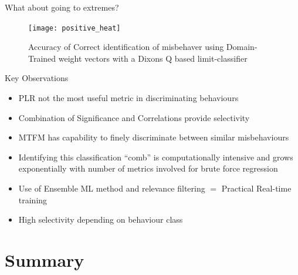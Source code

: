 \documentclass[aspectratio=169]{beamer}
\begin{document}
\begin{frame}{What about going to extremes?}

  \begin{figure}
    \centering
    \texttt{[image: positive\_heat]}
    \caption{Accuracy of Correct identification of misbehaver using Domain-Trained weight vectors with a Dixons Q based limit-classifier}
    \label{fig:positive_heat}
  \end{figure}

\end{frame}
\begin{frame}{Key Observations}
  \begin{itemize}
    \item PLR not the most useful metric in \alert{discriminating} behaviours
      \pause\item Combination of Significance and Correlations provide selectivity
      \pause\item MTFM has capability to finely discriminate between similar misbehaviours
      \pause\item Identifying this classification ``comb'' is computationally intensive and grows exponentially with number of metrics involved for brute force regression
      \pause\item Use of Ensemble ML method and relevance filtering $=$ Practical Real-time training
      \pause\item High  selectivity depending on behaviour class
  \end{itemize}
\end{frame}


\section*{Summary}
\end{document}
